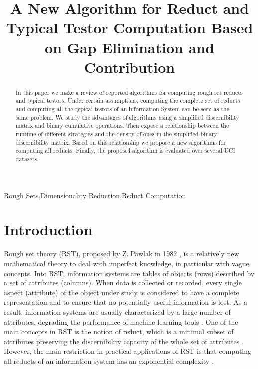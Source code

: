 \documentclass[authoryear,preprint,review,12pt]{elsarticle}
\begin{document}
	
	\title{A New Algorithm for Reduct and Typical Testor Computation Based on Gap Elimination and Contribution}
	
	
	\address{Computer Science Department\\National Institute of
	Astrophysics, Optics and Electronics\\
	Luis Enrique Erro \# 1, Santa Mar\'{\i}a Tonantzintla, Puebla,
	72840, M\'{e}xico} 
	
	\begin{abstract}
		In this paper we make a review of reported algorithms for computing rough set reducts and typical testors.
		Under certain assumptions, computing the complete set of reducts and computing all the typical testors 
		of an Information System can be seen as the same problem. We study the advantages of algorithms using
		a simplified discernibility matrix and binary cumulative operations. Then expose a relationship between
		the runtime of different strategies and the density of ones in the simplified binary discernibility matrix.
		Based on this relationship we propose a new algorithms for computing all reducts. Finally, the proposed 
		algorithm is evaluated over several UCI datasets.
	\end{abstract}
	
	\begin{keyword}
		Rough Sets\sep Dimensionality Reduction\sep Reduct Computation.
	\end{keyword}

	\maketitle


\section{Introduction}
  Rough set theory (RST), proposed by Z. Pawlak in 1982 \citep{Pawlak81,Pawlak81-2,Pawlak82,Pawlak91}, 
  is a relatively new mathematical theory to deal with imperfect knowledge, in particular with vague 
  concepts. Into RST, information systems are tables of objects (rows) described by a set of attributes (columns). 
  When data is collected or recorded, every single aspect (attribute) of the object under study is considered 
  to have a complete representation and to ensure that no potentially useful information is lost.
  As a result, information systems are usually characterized by a large number of attributes,
  degrading the performance of machine learning tools \citep{Parthalain08}.
  One of the main concepts in RST is the notion of reduct, which is a minimal subset of attributes 
  preserving the discernibility capacity of the whole set of attributes \citep{Pawlak91}.  
  However, the main restriction in practical applications of RST is that computing all reducts of an information 
  system has an exponential complexity \citep{Skowron92}. 
  
\end{document}
